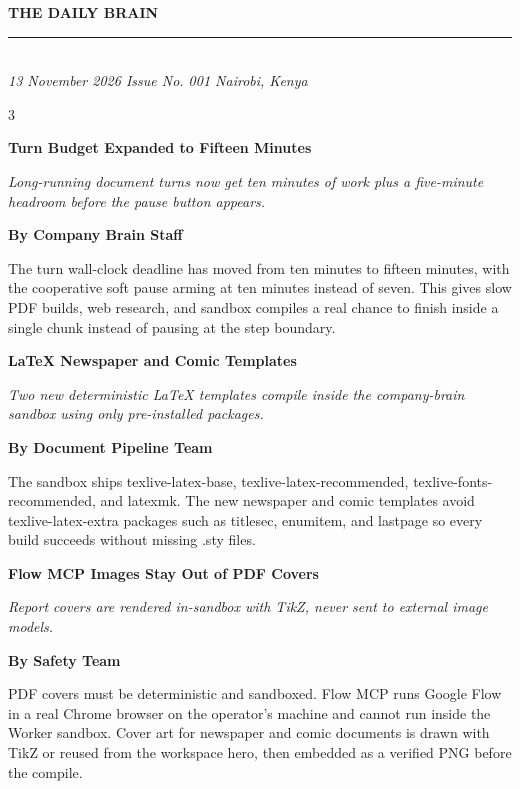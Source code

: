 \documentclass[10pt,a4paper]{article}
\newcommand{\masthead}[1]{{\color{newsaccent}\fontsize{26}{30}\selectfont\textbf{#1}}}
\newcommand{\newspaperDate}[1]{{\small\itshape #1}}
\newcommand{\headline}[1]{{\color{newsblack}\fontsize{18}{22}\selectfont\textbf{#1}\par\vspace{4pt}}}
\newcommand{\subhead}[1]{{\itshape #1}\par\vspace{6pt}}
\newcommand{\byline}[1]{{\small\textbf{#1}}\par\vspace{2pt}}
\begin{document}
\thispagestyle{empty}

\begin{center}
\masthead{THE DAILY BRAIN}\\[2pt]
{\color{newsrule}\rule{\textwidth}{1.4pt}}\\[6pt]
\newspaperDate{13 November 2026 \hfill Issue No. 001 \hfill Nairobi, Kenya}
\end{center}

\vspace{10pt}

\begin{multicols}{3}
\headline{Turn Budget Expanded to Fifteen Minutes}

\subhead{Long-running document turns now get ten minutes of work plus a five-minute headroom before the pause button appears.}

\byline{By Company Brain Staff}

The turn wall-clock deadline has moved from ten minutes to fifteen minutes, with the cooperative soft pause arming at ten minutes instead of seven. This gives slow PDF builds, web research, and sandbox compiles a real chance to finish inside a single chunk instead of pausing at the step boundary.

\columnbreak

\headline{LaTeX Newspaper and Comic Templates}

\subhead{Two new deterministic LaTeX templates compile inside the company-brain sandbox using only pre-installed packages.}

\byline{By Document Pipeline Team}

The sandbox ships texlive-latex-base, texlive-latex-recommended, texlive-fonts-recommended, and latexmk. The new newspaper and comic templates avoid texlive-latex-extra packages such as titlesec, enumitem, and lastpage so every build succeeds without missing .sty files.

\columnbreak

\headline{Flow MCP Images Stay Out of PDF Covers}

\subhead{Report covers are rendered in-sandbox with TikZ, never sent to external image models.}

\byline{By Safety Team}

PDF covers must be deterministic and sandboxed. Flow MCP runs Google Flow in a real Chrome browser on the operator's machine and cannot run inside the Worker sandbox. Cover art for newspaper and comic documents is drawn with TikZ or reused from the workspace hero, then embedded as a verified PNG before the compile.

\end{multicols}
\end{document}
